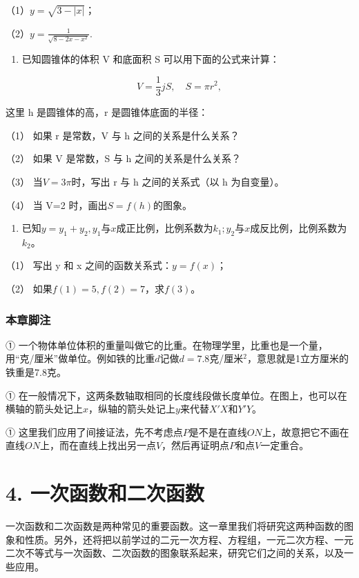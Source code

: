 （1）\(y = \sqrt{3 - |x|}\)；

（2）\(y = \frac{1}{\sqrt{8 - 2x - x^2}}.\)

\begin{enumerate}[start=4]
\item
  已知圆锥体的体积 V 和底面积 S 可以用下面的公式来计算：
\end{enumerate}

\[
V = \frac{1}{3} j S, \quad S = \pi r^{2},
\]

这里 h 是圆锥体的高，r 是圆锥体底面的半径：

（1） 如果 r 是常数，V 与 h 之间的关系是什么关系？

（2） 如果 V 是常数，S 与 h 之间的关系是什么关系？

（3） 当\(V = 3\pi\)时，写出 r 与 h 之间的关系式（以 h 为自变量）。

（4） 当 V=2 时，画出\(S=f(h)\)的图象。

\begin{enumerate}[start=5]
\item
  已知\(y = y_{1} + y_{2}, y_{1}\)与\(x\)成正比例，比例系数为\(k_{1}; y_{2}\)与\(x\)成反比例，比例系数为\(k_{2}\)。
\end{enumerate}

（1） 写出 y 和 x 之间的函数关系式：\(y = f(x)\)；

（2） 如果\(f(1)=5, f(2)=7\)，求\(f(3)\)。

\subsection{本章脚注}

①
一个物体单位体积的重量叫做它的比重。在物理学里，比重也是一个量，用``克/厘米''做单位。例如铁的比重\(d\)记做\(d = 7.8\)克/厘米\(^{2}\)，意思就是1立方厘米的铁重是7.8克。

①
在一般情况下，这两条数轴取相同的长度线段做长度单位。在图上，也可以在横轴的箭头处记上\(x\)，纵轴的箭头处记上\(y\)来代替\(X'X\)和\(Y'Y\)。

①
这里我们应用了间接证法，先不考虑点\(P\)是不是在直线\(ON\)上，故意把它不画在直线\(ON\)上，而在直线上找出另一点\(V\)，然后再证明点\(P\)和点\(V\)一定重合。

\chapter{4. 一次函数和二次函数}

一次函数和二次函数是两种常见的重要函数。这一章里我们将研究这两种函数的图象和性质。另外，还将把以前学过的二元一次方程、方程组，一元二次方程、一元二次不等式与一次函数、二次函数的图象联系起来，研究它们之间的关系，以及一些应用。

